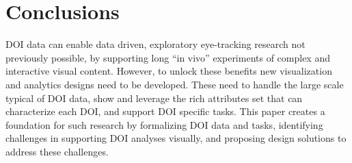 \section{Conclusions}
\label{sec:Limitations}
DOI data can enable data driven, exploratory eye-tracking research not previously possible, by supporting long ``in vivo'' experiments of complex and interactive visual content. However, to unlock these benefits new visualization and analytics designs need to be developed. These need to handle the large scale typical of DOI data, show and leverage the rich attributes set that can characterize each DOI, and support DOI specific tasks. This paper creates a foundation for such research by formalizing DOI data and tasks, identifying challenges in supporting DOI analyses visually, and proposing design solutions to address these challenges. 


